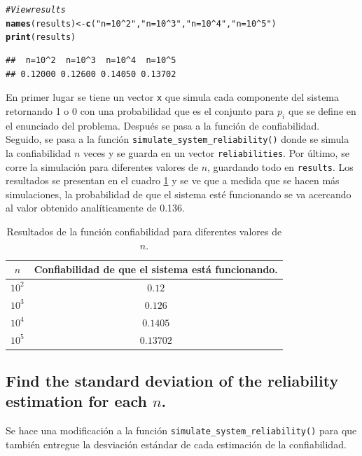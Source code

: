 \documentclass[12pt]{article}\usepackage[]{graphicx}\usepackage[]{xcolor}
\makeatletter
\newcommand{\hlsng}[1]{\textcolor[rgb]{0.192,0.494,0.8}{#1}}%
\newcommand{\hlcom}[1]{\textcolor[rgb]{0.678,0.584,0.686}{\textit{#1}}}%
\newcommand{\hldef}[1]{\textcolor[rgb]{0.345,0.345,0.345}{#1}}%
\newcommand{\hlkwb}[1]{\textcolor[rgb]{0.69,0.353,0.396}{#1}}%
\newcommand{\hlkwd}[1]{\textcolor[rgb]{0.737,0.353,0.396}{\textbf{#1}}}%
\newenvironment{kframe}{%
 \def\at@end@of@kframe{}%
 \ifinner\ifhmode%
  \def\at@end@of@kframe{\end{minipage}}%
  \begin{minipage}{\columnwidth}%
 \fi\fi%
 \def\FrameCommand##1{\hskip\@totalleftmargin \hskip-\fboxsep
 \colorbox{shadecolor}{##1}\hskip-\fboxsep
     \hskip-\linewidth \hskip-\@totalleftmargin \hskip\columnwidth}%
 \MakeFramed {\advance\hsize-\width
   \@totalleftmargin\z@ \linewidth\hsize
   \@setminipage}}%
 {\par\unskip\endMakeFramed%
 \at@end@of@kframe}
\newenvironment{knitrout}{}{} %
\makeatother
\begin{document}
\begin{knitrout}
\begin{kframe}
\begin{alltt}
\hlcom{# View results}
\hlkwd{names}\hldef{(results)} \hlkwb{<-} \hlkwd{c}\hldef{(}\hlsng{"n=10^2"}\hldef{,} \hlsng{"n=10^3"}\hldef{,} \hlsng{"n=10^4"}\hldef{,} \hlsng{"n=10^5"}\hldef{)}
\hlkwd{print}\hldef{(results)}
\end{alltt}
\begin{verbatim}
##  n=10^2  n=10^3  n=10^4  n=10^5 
## 0.12000 0.12600 0.14050 0.13702
\end{verbatim}
\end{kframe}
\end{knitrout}


En primer lugar se tiene un vector \lstinline|x| que simula cada componente del sistema retornando 1 o 0 con una probabilidad que es el conjunto para $p_{i}$ que se define en el enunciado del problema. Después se pasa a la función de confiabilidad. Seguido, se pasa a la función \lstinline|simulate_system_reliability()| donde se simula la confiabilidad $n$ veces y se guarda en un vector \lstinline|reliabilities|. Por último, se corre la simulación para diferentes valores de $n$, guardando todo en \lstinline|results|. Los resultados se presentan en el cuadro \ref{tab:reliability} y se ve que a medida que se hacen más simulaciones, la probabilidad de que el sistema esté funcionando se va acercando al valor obtenido analíticamente de 0.136.

\begin{table}[ht]
  \centering
  \begin{tabular}{|c|c|}
    \hline
    $n$& Confiabilidad de que el sistema está funcionando. \\ \hline
    $10^{2}$ & $0.12$ \\ \hline
    $10^{3}$ & $0.126$ \\ \hline
    $10^{4}$ & $0.1405$\\ \hline
    $10^{5}$ & $0.13702$\\ \hline
  \end{tabular}
  \caption{Resultados de la función confiabilidad para diferentes valores de $n$. }
  \label{tab:reliability}
\end{table}

\subsection{Find the standard deviation of the reliability estimation for each $n$.}

Se hace una modificación a la función \lstinline|simulate_system_reliability()| para que también entregue la desviación estándar de cada estimación de la confiabilidad.
\end{document}

